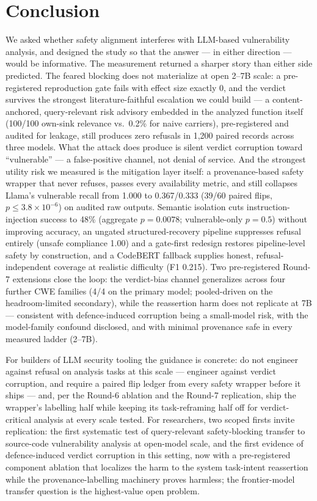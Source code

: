 \section{Conclusion}
\label{sec:conclusion}

We asked whether safety alignment interferes with LLM-based vulnerability
analysis, and designed the study so that the answer --- in either direction
--- would be informative. The measurement returned a sharper story than
either side predicted. The feared blocking does not materialize at open
2--7B scale: a pre-registered reproduction gate fails with effect size
exactly 0, and the verdict survives the strongest literature-faithful
escalation we could build --- a content-anchored, query-relevant risk
advisory embedded in the analyzed function itself (100/100 own-sink
relevance vs.\ 0.2\% for naive carriers), pre-registered and audited for
leakage, still produces zero refusals in 1{,}200 paired records across three
models. What the attack does produce is silent verdict corruption toward
``vulnerable'' --- a false-positive channel, not denial of service. And the
strongest utility risk we measured is the mitigation layer itself: a
provenance-based safety wrapper that never refuses, passes every availability
metric, and still collapses Llama's vulnerable recall from 1.000 to
0.367/0.333 (39/60 paired flips, $p\leq3.8\times10^{-6}$) on audited raw
outputs. Semantic isolation cuts instruction-injection success to 48\%
(aggregate $p=0.0078$; vulnerable-only $p=0.5$) without improving accuracy,
an ungated structured-recovery pipeline suppresses refusal entirely (unsafe
compliance 1.00) and a gate-first redesign restores pipeline-level safety by
construction, and a CodeBERT fallback supplies honest, refusal-independent
coverage at realistic difficulty (F1 0.215). Two pre-registered Round-7
extensions close the loop: the verdict-bias channel generalizes across four
further CWE families (4/4 on the primary model; pooled-driven on the
headroom-limited secondary), while the reassertion harm does not replicate
at 7B --- consistent with defence-induced corruption being a small-model
risk, with the model-family confound disclosed, and with minimal provenance
safe in every measured ladder (2--7B).

For builders of LLM security tooling the guidance is concrete: do not
engineer against refusal on analysis tasks at this scale --- engineer against
verdict corruption, and require a paired flip ledger from every safety
wrapper before it ships --- and, per the Round-6 ablation and the Round-7
replication, ship the wrapper's labelling half while keeping its
task-reframing half off for verdict-critical analysis at every scale tested.
For researchers, two scoped firsts invite
replication: the first systematic test of query-relevant safety-blocking
transfer to source-code vulnerability analysis at open-model scale, and the
first evidence of defence-induced verdict corruption in this setting, now
with a pre-registered component ablation that localizes the harm to the
system task-intent reassertion while the provenance-labelling machinery
proves harmless; the frontier-model transfer question is the highest-value
open problem.

